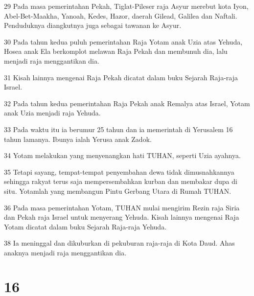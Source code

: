 \par 29 Pada masa pemerintahan Pekah, Tiglat-Pileser raja Asyur merebut kota Iyon, Abel-Bet-Maakha, Yanoah, Kedes, Hazor, daerah Gilead, Galilea dan Naftali. Penduduknya diangkutnya juga sebagai tawanan ke Asyur.
\par 30 Pada tahun kedua puluh pemerintahan Raja Yotam anak Uzia atas Yehuda, Hosea anak Ela berkomplot melawan Raja Pekah dan membunuh dia, lalu menjadi raja menggantikan dia.
\par 31 Kisah lainnya mengenai Raja Pekah dicatat dalam buku Sejarah Raja-raja Israel.
\par 32 Pada tahun kedua pemerintahan Raja Pekah anak Remalya atas Israel, Yotam anak Uzia menjadi raja Yehuda.
\par 33 Pada waktu itu ia berumur 25 tahun dan ia memerintah di Yerusalem 16 tahun lamanya. Ibunya ialah Yerusa anak Zadok.
\par 34 Yotam melakukan yang menyenangkan hati TUHAN, seperti Uzia ayahnya.
\par 35 Tetapi sayang, tempat-tempat penyembahan dewa tidak dimusnahkannya sehingga rakyat terus saja mempersembahkan kurban dan membakar dupa di situ. Yotamlah yang membangun Pintu Gerbang Utara di Rumah TUHAN.
\par 36 Pada masa pemerintahan Yotam, TUHAN mulai mengirim Rezin raja Siria dan Pekah raja Israel untuk menyerang Yehuda. Kisah lainnya mengenai Raja Yotam dicatat dalam buku Sejarah Raja-raja Yehuda.
\par 38 Ia meninggal dan dikuburkan di pekuburan raja-raja di Kota Daud. Ahas anaknya menjadi raja menggantikan dia.

\chapter{16}

